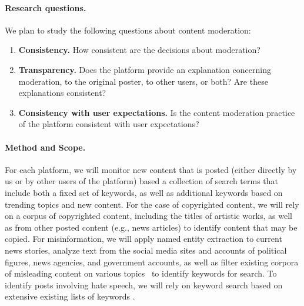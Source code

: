 \paragraph{Research questions.} We plan to study the following questions about
content moderation: 
\begin{enumerate}
    \item {\bf Consistency.} How consistent are the decisions about moderation?  
    \item {\bf Transparency.} Does the platform provide an explanation concerning moderation, to
        the original poster, to other users, or both? Are these explanations
        consistent?  
    \item {\bf Consistency with user expectations.} Is the content moderation
        practice of the platform consistent with user expectations?
\end{enumerate} 

\paragraph{Method and Scope.} 
For each platform, we will monitor new content that is posted 
(either directly by us or by other users of the platform) based a collection
of search terms that include both a fixed set of keywords, as well as
additional keywords based on trending topics and new content. For the case of
copyrighted content, we will rely on a corpus of copyrighted content,
including the titles of artistic works, as well as from other posted
content (e.g., news articles) to identify content that may be copied. 
For misinformation, we will apply named entity extraction to current news stories,
analyze text from the social media sites and accounts of political figures, news agencies,
and government accounts, as well as filter existing corpora of misleading content on various topics~\cite{pathak2019breaking,shahi2021exploratory} to identify keywords for search. To identify posts
involving hate speech, we will rely on keyword search based on extensive existing lists
of keywords \cite{vidgen2020directions}.

